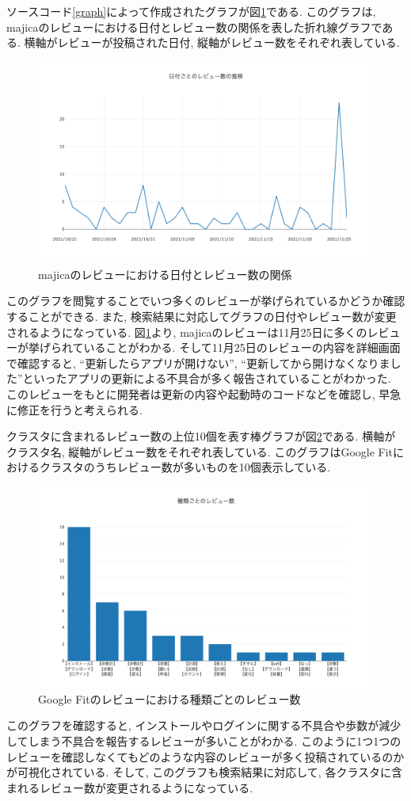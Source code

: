 ソースコード\ref{graph}によって作成されたグラフが図\ref{fig:majica_graph}である. このグラフは, majicaのレビューにおける日付とレビュー数の関係を表した折れ線グラフである. 
横軸がレビューが投稿された日付, 縦軸がレビュー数をそれぞれ表している. 

\begin{figure}[H]
  \centering
  \includegraphics[scale=0.4]
    {contents/images/majica_graph.png}
  \caption{majicaのレビューにおける日付とレビュー数の関係\label{fig:majica_graph}}
\end{figure}

このグラフを閲覧することでいつ多くのレビューが挙げられているかどうか確認することができる. また, 検索結果に対応してグラフの日付やレビュー数が変更されるようになっている. 
図\ref{fig:majica_graph}より, majicaのレビューは11月25日に多くのレビューが挙げられていることがわかる. そして11月25日のレビューの内容を詳細画面で確認すると, ``更新したらアプリが開けない'', ``更新してから開けなくなりました''といったアプリの更新による不具合が多く報告されていることがわかった. 
このレビューをもとに開発者は更新の内容や起動時のコードなどを確認し, 早急に修正を行うと考えられる. 

クラスタに含まれるレビュー数の上位10個を表す棒グラフが図\ref{fig:top10}である. 横軸がクラスタ名, 縦軸がレビュー数をそれぞれ表している. 
このグラフはGoogle Fitにおけるクラスタのうちレビュー数が多いものを10個表示している. 

\begin{figure}[H]
  \centering
  \includegraphics[scale=0.4]
    {contents/images/top10.png}
  \caption{Google Fitのレビューにおける種類ごとのレビュー数\label{fig:top10}}
\end{figure}

このグラフを確認すると, インストールやログインに関する不具合や歩数が減少してしまう不具合を報告するレビューが多いことがわかる. このように1つ1つのレビューを確認しなくてもどのような内容のレビューが多く投稿されているのかが可視化されている. 
そして, このグラフも検索結果に対応して, 各クラスタに含まれるレビュー数が変更されるようになっている. 
